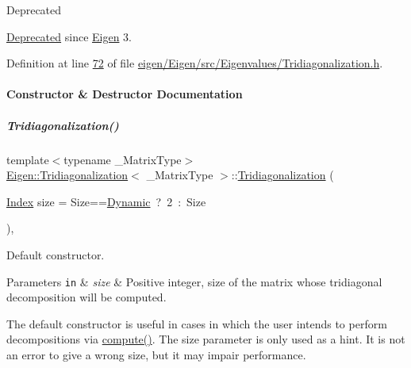 \begin{DoxyRefDesc}{Deprecated}
\item[\hyperlink{deprecated__deprecated000024}{Deprecated}]since \hyperlink{namespace_eigen}{Eigen} 3. \end{DoxyRefDesc}


Definition at line \hyperlink{eigen_2_eigen_2src_2_eigenvalues_2_tridiagonalization_8h_source_l00072}{72} of file \hyperlink{eigen_2_eigen_2src_2_eigenvalues_2_tridiagonalization_8h_source}{eigen/\+Eigen/src/\+Eigenvalues/\+Tridiagonalization.\+h}.



\paragraph{Constructor \& Destructor Documentation}
\mbox{\label{group___eigenvalues___module_a9ea2e6154bf35494ee68e037f0867cbd}} 
\subparagraph{\texorpdfstring{Tridiagonalization()}{Tridiagonalization()}\hspace{0.1cm}{\footnotesize\ttfamily [1/4]}}
{\footnotesize\ttfamily template$<$typename \+\_\+\+Matrix\+Type$>$ \\
\hyperlink{group___eigenvalues___module_class_eigen_1_1_tridiagonalization}{Eigen\+::\+Tridiagonalization}$<$ \+\_\+\+Matrix\+Type $>$\+::\hyperlink{group___eigenvalues___module_class_eigen_1_1_tridiagonalization}{Tridiagonalization} (\begin{DoxyParamCaption}\item[{\hyperlink{group___eigenvalues___module_a7bd1f9fccec1e93b77a2214b2d30aae9}{Index}}]{size = {\ttfamily Size==\hyperlink{namespace_eigen_ad81fa7195215a0ce30017dfac309f0b2}{Dynamic}~?~2~\+:~Size} }\end{DoxyParamCaption})\hspace{0.3cm}{\ttfamily [inline]}, {\ttfamily [explicit]}}



Default constructor. 


\begin{DoxyParams}[1]{Parameters}
\mbox{\tt in}  & {\em size} & Positive integer, size of the matrix whose tridiagonal decomposition will be computed.\\
\hline
\end{DoxyParams}
The default constructor is useful in cases in which the user intends to perform decompositions via \hyperlink{group___eigenvalues___module_acd288abb081d3b40b87e4b98cd8f6ee9}{compute()}. The {\ttfamily size} parameter is only used as a hint. It is not an error to give a wrong {\ttfamily size}, but it may impair performance.

